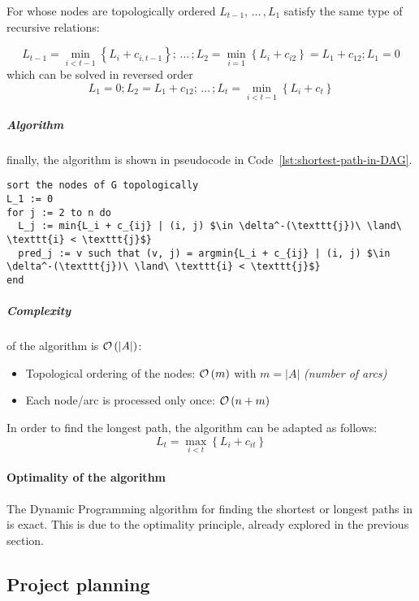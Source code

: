 \documentclass[english]{article}
\begin{document}
For \DAGs whose nodes are topologically ordered \(L_{t-1}, \, \ldots \,, L_1\) satisfy the same type of recursive relations:

\[ L_{t-1} = \displaystyle \min_{i < t-1} \left\{ L_i + c_{i, t-1} \right\}; \, \ldots \,; L_2 = \displaystyle \min_{i=1}\left\{ L_i + c_{i2} \right\} = L_1 + c_{12}; L_1 = 0 \]
which can be solved in reversed order
\[ L_1 = 0; L_2 = L_1 + c_{12}; \, \ldots \,; L_{t} = \displaystyle \min_{i < t - 1} \left\{ L_i + c_t \right\} \]

\subparagraph*{Algorithm}
finally, the algorithm is shown in pseudocode in Code~\ref{lst:shortest-path-in-DAG}.

\begin{lstlisting}[caption={Shortest path in \DAG}, label={lst:shortest-path-in-DAG}, float]
sort the nodes of G topologically
L_1 := 0
for j := 2 to n do
  L_j := min{L_i + c_{ij} | (i, j) $\in \delta^-(\texttt{j})\ \land\ \texttt{i} < \texttt{j}$}
  pred_j := v such that (v, j) = argmin{L_i + c_{ij} | (i, j) $\in \delta^-(\texttt{j})\ \land\ \texttt{i} < \texttt{j}$}
end
\end{lstlisting}

\subparagraph*{Complexity}
of the algorithm is \(\mathcal{O}\left(|A|\right)\):

\begin{itemize}
  \item Topological ordering of the nodes: \(\mathcal{O}\left(m\right)\) with \(m = |A|\) \textit{(number of arcs)}
  \item Each node/arc is processed only once: \(\mathcal{O}\left(n+m\right)\)
\end{itemize}

\bigskip
In order to find the longest path, the algorithm can be adapted as follows:
\[L_t = \displaystyle \max_{i < t} \left\{ L_i + c_{it} \right\}\]

\paragraph{Optimality of the algorithm}

The Dynamic Programming algorithm for finding the shortest or longest paths in \DAGs is exact.
This is due to the optimality principle, already explored in the previous section.

\subsection{Project planning}
\end{document}
